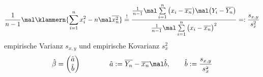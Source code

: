 \begin{beispiel}
\begin{align*}
{		}{
			\frac{1}{n-1}\mal\klammern{\sum\limits_{i=1}^n x_i^2-n\mal \overline{x_n^2}}
		}
		\overset{!}{=}
		\frac{
			\frac{1}{n-1}\mal\sum\limits_{i=1}^n\big(x_i-\overline{x_n}\big)\mal\big(Y_i-\overline{Y_n}\big)
		}{
			\frac{1}{n-1}\mal \sum\limits_{i=1}^n\big(x_i-\overline{x_n}\big)^2
		}
		=:\frac{s_{x,y}}{s_x^2}
	\end{align*}
	empirische Varianz $s_{x,y}$ und empirische Kovarianz $s_x^2$
	\begin{align*}
		\hat{\beta}=\begin{pmatrix}
			\hat{a}\\
			\hat{b}
		\end{pmatrix}\qquad\mit\qquad
		\hat{a}:=\overline{Y_n}-\overline{x_n}\mal\hat{b},\qquad
		\hat{b}:=\frac{s_{x,y}}{s_x^2}
	\end{align*}
\end{beispiel}







